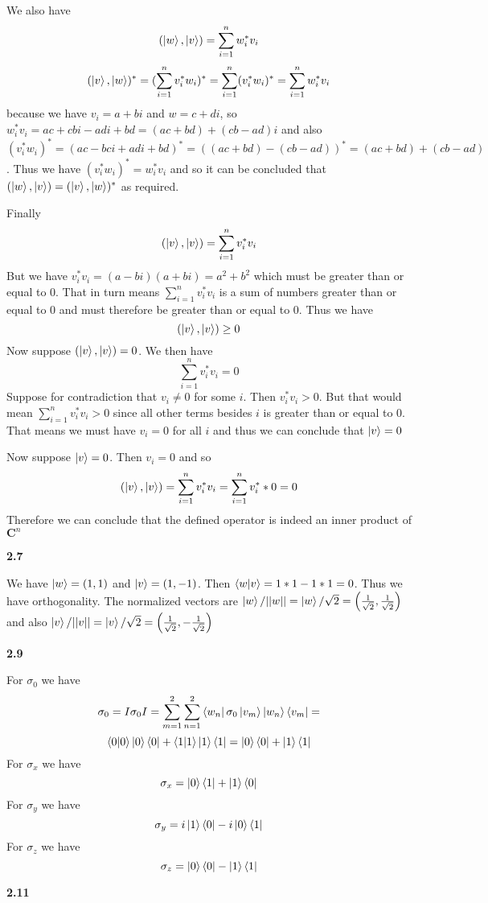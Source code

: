We also have \[ (\ket{w},\ket{v}) = \sum\limits_{i=1}^nw_i^*v_i\]\[(\ket{v},\ket{w})^* = (\sum\limits_{i=1}^nv_i^*w_i)^* = \sum\limits_{i=1}^n(v_i^*w_i)^*=\sum\limits_{i=1}^nw_i^*v_i\]
because we have $ v_i = a+bi$ and $ w= c+di$, so $ w_i^*v_i = ac +cbi -adi +bd = (ac+bd) + (cb-ad)i$ and also $(v_i^*w_i)^* = (ac -bci +adi +bd)^* = ((ac+bd) -(cb-ad))^* = (ac+bd) +(cb-ad)$. Thus we have $(v_i^*w_i)^* = w_i^*v_i$ and so it can be concluded that $ (\ket{w},\ket{v}) = (\ket{v},\ket{w})^*$ as required. 

Finally \[(\ket{v},\ket{v}) = \sum_{i=1}^n v^*_iv_i\] But we have $v^*_iv_i = (a-bi)(a+bi)= a^2 +b^2$ which must be greater than or equal to $0$.
That in turn means $\sum_{i=1}^n v^*_iv_i$ is a sum of numbers greater than or equal to 0 and must therefore be greater than or equal to 0. Thus we have 
\[(\ket{v},\ket{v})\geq 0\]
Now suppose $(\ket{v},\ket{v}) = 0$. We then have 
\[\sum_{i=1}^n v^*_iv_i = 0\]Suppose for contradiction that $ v_i\neq 0$ for some $i$. Then $v^*_iv_i > 0$. But that would mean $\sum_{i=1}^n v^*_iv_i>0$ since all other terms besides $i$ is greater than or equal to 0. That means we must have $v_i = 0$ for all $i$ and thus we can conclude that $\ket{v} = 0$

Now suppose $\ket{v} = 0$. Then $v_i = 0$ and so \[(\ket{v},\ket{v}) = \sum_{i=1}^n v^*_iv_i = \sum_{i=1}^n v^*_i*0 = 0\]Therefore we can conclude that the defined operator is indeed an inner product of $ \textbf{C}^n$

\textbf{2.7}

We have $\ket{w} = (1,1)$ and $ \ket{v} = (1,-1)$. Then $ \braket{w|v} =1*1 -1*1 = 0$. Thus we have orthogonality. The normalized vectors are $\ket{w}/||w|| = \ket{w}/\sqrt{2} = \left(\frac{1}{\sqrt{2}}, \frac{1}{\sqrt{2}}\right) $ and also $ \ket{v}/||v|| = \ket{v}/ \sqrt{2} =\left(\frac{1}{\sqrt{2}}, -\frac{1}{\sqrt{2}}\right)$



\textbf{2.9}

For $\sigma_0$ we have \[\sigma_0=I\sigma_0I = \sum_{m=1}^2\sum_{n=1}^2\bra{w_n}\sigma_0\ket{v_m}\ket{w_n}\bra{v_m} =\]\[\braket{0|0}\ket{0}\bra{0} + \braket{1|1}\ket{1}\bra{1} = \ket{0}\bra{0} + \ket{1}\bra{1}\]
For $\sigma_x$ we have 
\[\sigma_x = \ket{0}\bra{1} + \ket{1}\bra{0}\]
For $\sigma_y$ we have 
\[\sigma_y = i\ket{1}\bra{0}-i\ket{0}\bra{1}\] 
For $\sigma_z$ we have \[\sigma_z = \ket{0}\bra{0} - \ket{1}\bra{1}\]

\textbf{2.11}

